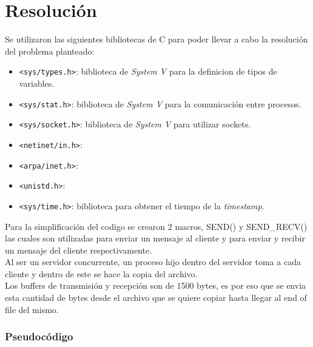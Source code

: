 \section{Resolución}

Se utilizaron las siguientes bibliotecas de C para poder llevar a cabo la resolución del problema planteado:
\begin{itemize}
    \item \texttt{<sys/types.h>}: biblioteca de \textit{System V} para la definicion de tipos de variables.
    \item \texttt{<sys/stat.h>}: biblioteca de \textit{System V} para la comunicación entre procesos.
    \item \texttt{<sys/socket.h>}: biblioteca de \textit{System V} para utilizar sockets.
    \item \texttt{<netinet/in.h>}: 
    \item \texttt{<arpa/inet.h>}: 
    \item \texttt{<unistd.h>}: 
    \item \texttt{<sys/time.h>}: biblioteca para obtener el tiempo de la \textit{timestamp}.
\end{itemize}

Para la simplificación del codigo se crearon 2 macros, SEND() y SEND_RECV() las cuales son utilizadas para enviar un mensaje al cliente y para enviar y recibir un mensaje del cliente respectivamente.\\
Al ser un servidor concurrente, un proceso hijo dentro del servidor toma a cada cliente y dentro de este se hace la copia del archivo.\\
Los buffers de transmisión y recepción son de 1500 bytes, es por eso que se envia esta cantidad de bytes desde el archivo que se quiere copiar hasta llegar al end of file del mismo.\\

\subsubsection{Pseudocódigo}

